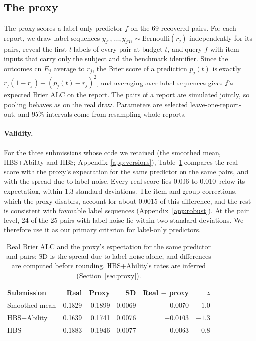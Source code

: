 \documentclass{article}
\begin{document}
\subsection{The proxy}

The proxy scores a label-only predictor $f$ on the 69 recovered pairs. For each report, we draw label sequences $y_{j1}, \dots, y_{j31} \sim \mathrm{Bernoulli}(r_j)$ independently for its pairs, reveal the first $t$ labels of every pair at budget $t$, and query $f$ with item inputs that carry only the subject and the benchmark identifier. Since the outcomes on $E_j$ average to $r_j$, the Brier score of a prediction $p_j(t)$ is exactly $r_j(1 - r_j) + (p_j(t) - r_j)^2$, and averaging over label sequences gives $f$'s expected Brier ALC on the report. The pairs of a report are simulated jointly, so pooling behaves as on the real draw. Parameters are selected leave-one-report-out, and 95\% intervals come from resampling whole reports.

\paragraph{Validity.} For the three submissions whose code we retained (the smoothed mean, HBS+Ability and HBS; Appendix~\ref{app:versions}), Table~\ref{tab:proxy} compares the real score with the proxy's expectation for the same predictor on the same pairs, and with the spread due to label noise. Every real score lies 0.006 to 0.010 below its expectation, within 1.3 standard deviations. The item and group corrections, which the proxy disables, account for about 0.0015 of this difference, and the rest is consistent with favorable label sequences (Appendix~\ref{app:robust}). At the pair level, 24 of the 25 pairs with label noise lie within two standard deviations. We therefore use it as our primary criterion for label-only predictors.

\begin{table}[t]
  \caption{Real Brier ALC and the proxy's expectation for the same predictor and pairs; SD is the spread due to label noise alone, and differences are computed before rounding. HBS+Ability's rates are inferred (Section~\ref{sec:proxy}).}
  \label{tab:proxy}
  \centering
  \small
  \begin{tabular}{lrrrrr}
    \toprule
    Submission & Real & Proxy & SD & Real $-$ proxy & $z$ \\
    \midrule
    Smoothed mean & 0.1829 & 0.1899 & 0.0069 & $-0.0070$ & $-1.0$ \\
    HBS+Ability & 0.1639 & 0.1741 & 0.0076 & $-0.0103$ & $-1.3$ \\
    HBS & 0.1883 & 0.1946 & 0.0077 & $-0.0063$ & $-0.8$ \\
    \bottomrule
  \end{tabular}
\end{table}
\end{document}
